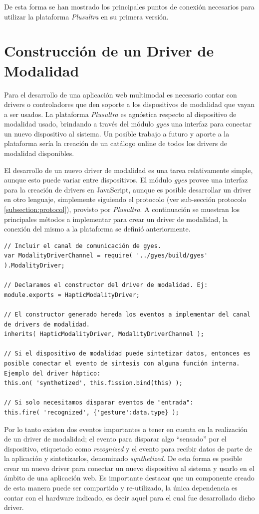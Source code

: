 De esta forma se han mostrado los principales puntos de conexión necesarios para utilizar la plataforma \emph{Plusultra} en su primera versión.

\section{Construcción de un Driver de Modalidad}
Para el desarrollo de una aplicación web multimodal es necesario contar con drivers o controladores que den soporte a los dispositivos de modalidad que vayan a ser usados. La plataforma \emph{Plusultra} es agnóstica respecto al dispositivo de modalidad usado, brindando a través del módulo \emph{gyes} una interfaz para conectar un nuevo dispositivo al sistema. Un posible trabajo a futuro y aporte a la plataforma sería la creación de un catálogo online de todos los drivers de modalidad disponibles.

El desarrollo de un nuevo driver de modalidad es una tarea relativamente simple, aunque esto puede variar entre dispositivos. El módulo \emph{gyes} provee una interfaz para la creación de drivers en JavaScript, aunque es posible desarrollar un driver en otro lenguaje, simplemente siguiendo el protocolo (ver sub-sección protocolo \ref{subsection:protocol}), provisto por \emph{Plusultra}.
A continuación se muestran los principales métodos a implementar para crear un driver de modalidad, la conexión del mismo a la plataforma se definió anteriormente.

\begin{lstlisting}
// Incluir el canal de comunicación de gyes.
var ModalityDriverChannel = require( '../gyes/build/gyes' ).ModalityDriver;

// Declaramos el constructor del driver de modalidad. Ej:
module.exports = HapticModalityDriver;

// El constructor generado hereda los eventos a implementar del canal de drivers de modalidad.
inherits( HapticModalityDriver, ModalityDriverChannel );

// Si el dispositivo de modalidad puede sintetizar datos, entonces es posible conectar el evento de sintesis con alguna función interna. Ejemplo del driver háptico:
this.on( 'synthetized', this.fission.bind(this) );

// Si solo necesitamos disparar eventos de "entrada":
this.fire( 'recognized', {'gesture':data.type} );

\end{lstlisting}

Por lo tanto existen dos eventos importantes a tener en cuenta en la realización de un driver de modalidad; el evento para disparar algo ``sensado'' por el dispositivo, etiquetado como \emph{recognized} y el evento para recibir datos de parte de la aplicación y sintetizarlos, denominado \emph{synthetized}.
De esta forma es posible crear un nuevo driver para conectar un nuevo dispositivo al sistema y usarlo en el ámbito de una aplicación web. Es importante destacar que un componente creado de esta manera puede ser compartido y re-utilizado, la única dependencia es contar con el hardware indicado, es decir aquel para el cual fue desarrollado dicho driver. 

